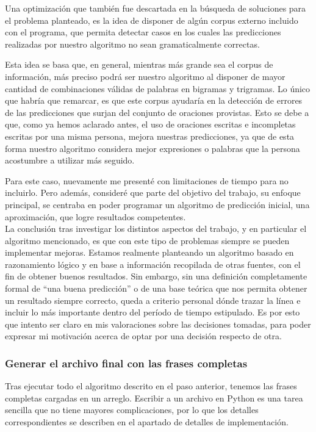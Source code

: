 \documentclass[a4paper]{article}
\begin{document}
Una optimización que también fue descartada en la búsqueda de soluciones para el problema planteado, es la idea de disponer de algún corpus externo incluido con el programa, que permita detectar casos en los cuales las predicciones realizadas por nuestro algoritmo no sean gramaticalmente correctas.

Esta idea se basa que, en general, mientras más grande sea el corpus de información, más preciso podrá ser nuestro algoritmo al disponer de mayor cantidad de combinaciones válidas de palabras en bigramas y trigramas. Lo único que habría que remarcar, es que este corpus ayudaría en la detección de errores de las predicciones que surjan del conjunto de oraciones provistas. Esto se debe a que, como ya hemos aclarado antes, el uso de oraciones escritas e incompletas escritas por una misma persona, mejora nuestras predicciones, ya que de esta forma nuestro algoritmo considera mejor expresiones o palabras que la persona acostumbre a utilizar más seguido.

Para este caso, nuevamente me presenté con limitaciones de tiempo para no incluirlo. Pero además, consideré que parte del objetivo del trabajo, su enfoque principal, se centraba en poder programar un algoritmo de predicción inicial, una aproximación, que logre resultados competentes. \\

La conclusión tras investigar los distintos aspectos del trabajo, y en particular el algoritmo mencionado, es que con este tipo de problemas siempre se pueden implementar mejoras. Estamos realmente planteando un algoritmo basado en razonamiento lógico y en base a información recopilada de otras fuentes, con el fin de obtener buenos resultados. Sin embargo, sin una definición completamente formal de ``una buena predicción'' o de una base teórica que nos permita obtener un resultado siempre correcto, queda a criterio personal dónde trazar la línea e incluir lo más importante dentro del período de tiempo estipulado. Es por esto que intento ser claro en mis valoraciones sobre las decisiones tomadas, para poder expresar mi motivación acerca de optar por una decisión respecto de otra.

\subsubsection{Generar el archivo final con las frases completas}

Tras ejecutar todo el algoritmo descrito en el paso anterior, tenemos las frases completas cargadas en un arreglo. Escribir a un archivo en Python es una tarea sencilla que no tiene mayores complicaciones, por lo que los detalles correspondientes se describen en el apartado de detalles de implementación.
\end{document}
